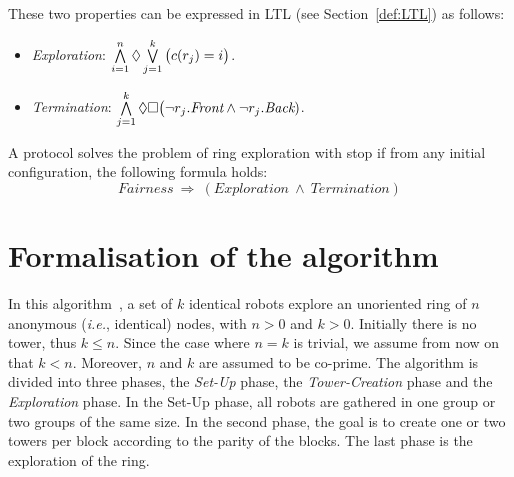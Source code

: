 These two properties can be expressed in \textsf{LTL} (see Section~\ref{def:LTL}) as follows: 
\begin{itemize}%
\item \emph{Exploration}: 
$\bigwedge\limits_{i=1}^n\Diamond\bigvee\limits_{j=1}^k\big(c(r_j)=i\big)$. 
\item \emph{Termination}: 
$\bigwedge\limits_{j=1}^k\Diamond\Box\big(\neg r_j.\textit{Front} 
\wedge \neg r_j.\textit{Back})$.
\end{itemize}

\begin{definition} A protocol solves the problem of ring exploration
  with stop if from any initial configuration, the following formula
  holds: 
  $$\textit{Fairness} \ \Rightarrow \ (\textit{Exploration} \ \wedge 
\ \textit{Termination})$$
\end{definition}


	
	
	
		\section{Formalisation of the algorithm}
In this algorithm~\cite{flocchini_computing_2007}, a set of $k$ identical robots explore an unoriented
ring of $n$ anonymous (\emph{i.e.}, identical) nodes, with $n>0$ and
$k>0$.  Initially there is no tower, thus $k
\leq n$. Since the case where $n=k$ is trivial, we assume from now on
that $k<n$. Moreover, $n$ and $k$ are assumed to be co-prime. The algorithm is
divided into three phases, the \emph{Set-Up} phase, the
\emph{Tower-Creation} phase and the \emph{Exploration} phase. In the
Set-Up phase, all robots are gathered in one group or two groups of
the same size.  In the second phase, the goal is to create one or two
towers per block according to the parity of the blocks. The last phase
is the exploration of the ring.

